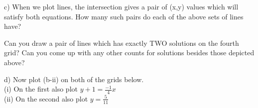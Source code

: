 \documentclass{article}
\begin{document}
\begin{flushleft}
c) When we plot lines, the intersection gives a pair of (x,y) values which will satisfy both equations. How many such pairs do each of the above sets of lines have?\\
\vspace{1in}

Can you draw a pair of lines which has exactly TWO solutions on the fourth grid? Can you come up with any other counts for solutions besides those depicted above?

\newpage
d) Now plot (b-ii) on both of the grids below.\\
(i) On the first also plot $y+1=\frac{-1}{4}x$ \\
(ii) On the second also plot $y=\frac{5}{11}$\\

\vspace{0.2in}


\end{flushleft}
\end{document}
